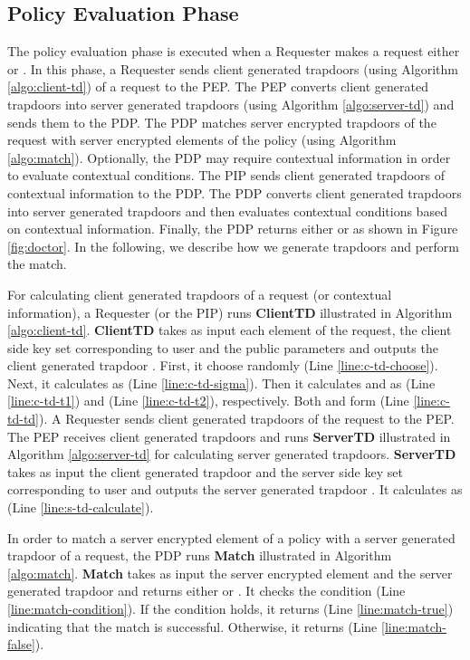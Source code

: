 \documentclass[final,5p,times,twocolumn]{elsarticle}
\begin{document}
\subsection{Policy Evaluation Phase}

The policy evaluation phase is executed when a Requester makes a request either  or . In this phase, a Requester sends client generated trapdoors (using Algorithm \ref{algo:client-td}) of a request to the PEP. The PEP converts client generated trapdoors into server generated trapdoors (using Algorithm \ref{algo:server-td}) and sends them to the PDP. The PDP matches server encrypted trapdoors of the request with server encrypted elements of the policy (using Algorithm \ref{algo:match}). Optionally, the PDP may require contextual information in order to evaluate contextual conditions. The PIP sends client generated trapdoors of contextual information to the PDP. The PDP converts client generated trapdoors into server generated trapdoors and then evaluates contextual conditions based on contextual information. Finally, the PDP returns either  or  as shown in Figure \ref{fig:doctor}. In the following, we describe how we generate trapdoors and perform the match. 

For calculating client generated trapdoors of a request (or contextual information), a Requester (or the PIP) runs \textbf{ClientTD} illustrated in Algorithm \ref{algo:client-td}. \textbf{ClientTD} takes as input each element  of the request, the client side key set  corresponding to user  and the public parameters  and outputs the client generated trapdoor . First, it choose randomly  (Line \ref{line:c-td-choose}). Next, it calculates  as  (Line \ref{line:c-td-sigma}). Then it calculates  and  as  (Line \ref{line:c-td-t1}) and  (Line \ref{line:c-td-t2}), respectively. Both  and  form  (Line \ref{line:c-td-td}). A Requester sends client generated trapdoors of the request to the PEP.
The PEP receives client generated trapdoors and runs \textbf{ServerTD} illustrated in Algorithm \ref{algo:server-td} for calculating server generated trapdoors. \textbf{ServerTD} takes as input the client generated trapdoor  and the server side key set  corresponding to user  and outputs the server generated trapdoor . It calculates  as   (Line \ref{line:s-td-calculate}).

In order to match a server encrypted element of a policy with a server generated trapdoor of a request, the PDP runs \textbf{Match} illustrated in Algorithm \ref{algo:match}. \textbf{Match} takes as input the server encrypted element  and the server generated trapdoor  and returns either  or . It checks the condition  (Line \ref{line:match-condition}). If the condition holds, it returns  (Line \ref{line:match-true}) indicating that the match is successful. Otherwise, it returns  (Line \ref{line:match-false}). 
\end{document}
